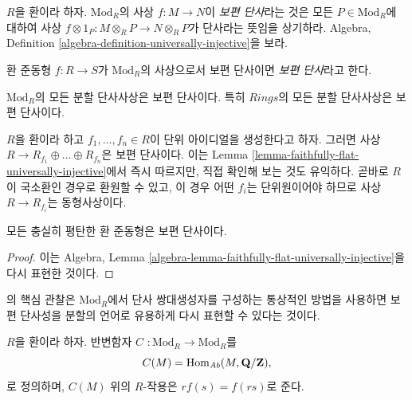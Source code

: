 \noindent
$R$을 환이라 하자. $\text{Mod}_R$의 사상 $f : M \to N$이
{\it 보편 단사}라는 것은 모든 $P \in \text{Mod}_R$에 대하여 사상
$f \otimes 1_P: M \otimes_R P \to N \otimes_R P$가 단사라는 뜻임을
상기하라. Algebra, Definition
\ref{algebra-definition-universally-injective}을 보라.

\begin{definition}
\label{definition-universally-injective}
환 준동형 $f: R \to S$가 $\text{Mod}_R$의 사상으로서 보편 단사이면
{\it 보편 단사}라고 한다.
\end{definition}

\begin{example}
\label{example-split-injection-universally-injective}
$\text{Mod}_R$의 모든 분할 단사사상은 보편 단사이다. 특히
$\textit{Rings}$의 모든 분할 단사사상은 보편 단사이다.
\end{example}

\begin{example}
\label{example-cover-universally-injective}
$R$을 환이라 하고 $f_1, \ldots, f_n \in R$이 단위 아이디얼을 생성한다고
하자. 그러면 사상 $R \to R_{f_1} \oplus \ldots \oplus R_{f_n}$은 보편
단사이다. 이는 Lemma \ref{lemma-faithfully-flat-universally-injective}에서
즉시 따르지만, 직접 확인해 보는 것도 유익하다. 곧바로 $R$이 국소환인
경우로 환원할 수 있고, 이 경우 어떤 $f_i$는 단위원이어야 하므로 사상
$R \to R_{f_i}$는 동형사상이다.
\end{example}

\begin{lemma}
\label{lemma-faithfully-flat-universally-injective}
모든 충실히 평탄한 환 준동형은 보편 단사이다.
\end{lemma}

\begin{proof}
이는 Algebra, Lemma
\ref{algebra-lemma-faithfully-flat-universally-injective}을 다시 표현한 것이다.
\end{proof}

\noindent
\cite{mesablishvili1}의 핵심 관찰은 $\text{Mod}_R$에서 단사 쌍대생성자를
구성하는 통상적인 방법을 사용하면 보편 단사성을 분할의 언어로 유용하게
다시 표현할 수 있다는 것이다.

\begin{definition}
\label{definition-C}
$R$을 환이라 하자. 반변함자
{\it $C$} $ : \text{Mod}_R \to \text{Mod}_R$를
$$
C(M) = \mathop{\mathrm{Hom}}\nolimits_{\textit{Ab}}(M, \mathbf{Q}/\mathbf{Z}),
$$
로 정의하며, $C(M)$ 위의 $R$-작용은 $rf(s) = f(rs)$로 준다.
\end{definition}

